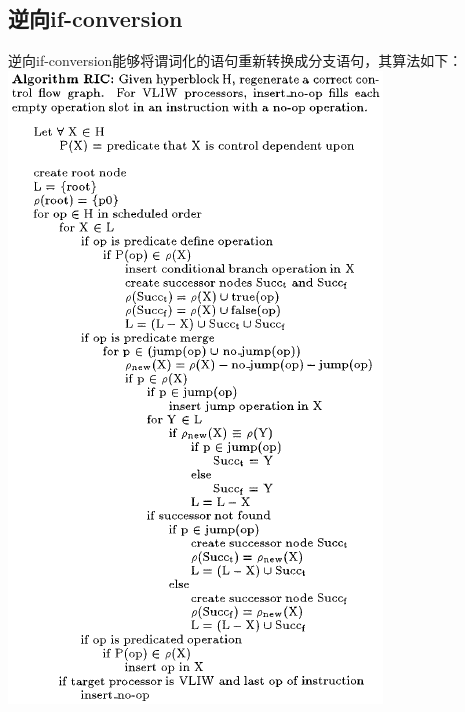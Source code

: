 \subsection{逆向if-conversion}

逆向if-conversion能够将谓词化的语句重新转换成分支语句，其算法如下：
\includegraphics[width=0.9\linewidth]{mechanism/RIC}